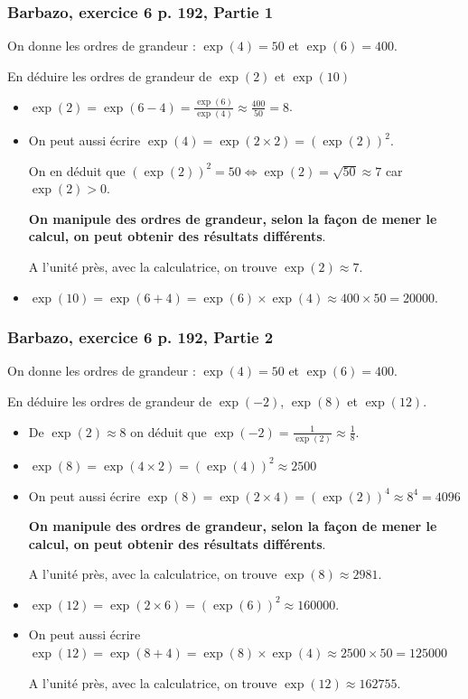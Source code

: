 \documentclass[11pt, hyperref={urlcolor=red,%
            linkcolor=blue, %
            colorlinks=true}]{beamer}
\begin{document}
\begin{frame}
\label{exo6}
\frametitle{Barbazo, exercice 6 p. 192, Partie 1}

On donne les ordres de grandeur : $\exp(4)=50$ et $\exp(6)=400$.

En déduire les ordres de grandeur de $\exp(2)$ et $\exp(10)$

\begin{itemize}
	\item $\exp(2) = \exp(6-4)=\frac{\exp(6)}{\exp(4)}\approx \frac{400}{50}=8$.
	\item On peut aussi écrire $\exp(4) = \exp(2 \times 2)=\left(\exp(2)\right)^{2}$.
	
	On en déduit que $\left(\exp(2)\right)^{2}=50 \Leftrightarrow \exp(2)=\sqrt{50} \approx 7$ car $\exp(2)>0$.
	
	
\textbf{On manipule des ordres de grandeur, selon la façon de mener le calcul, on peut obtenir des résultats différents}.

A l'unité près, avec la calculatrice, on trouve $\exp(2) \approx 7$.

	\item $\exp(10)=\exp(6 + 4)=\exp(6) \times \exp(4) \approx 400 \times 50 = 20000$.




	
\end{itemize}
\end{frame}


\begin{frame}
\frametitle{Barbazo, exercice 6 p. 192, Partie 2}

On donne les ordres de grandeur : $\exp(4)=50$ et $\exp(6)=400$.

En déduire les ordres de grandeur de  $\exp(-2)$, $\exp(8)$ et $\exp(12)$.

\begin{itemize}
	\item De $\exp(2) \approx 8$ on déduit que $\exp(-2)=\frac{1}{\exp(2)}\approx \frac{1}{8}$. 
	\item $\exp(8)= \exp(4 \times 2)=\left(\exp(4)\right)^{2}\approx 2500$
	
	
	\item On peut aussi écrire $\exp(8) = \exp(2 \times 4)=\left(\exp(2)\right)^{4}\approx 8^4 = 4096$
	
	\textbf{On manipule des ordres de grandeur, selon la façon de mener le calcul, on peut obtenir des résultats différents}.

A l'unité près, avec la calculatrice, on trouve $\exp(8) \approx 2981$.


	\item $\exp(12)=\exp(2 \times 6)=\left(\exp(6)\right)^{2}\approx 160000$.

	\item On peut aussi écrire $\exp(12) = \exp(8 + 4)=\exp(8) \times \exp(4) \approx 2500 \times 50 = 125000$


A l'unité près, avec la calculatrice, on trouve $\exp(12) \approx 162755$.
\end{itemize}
\end{frame}
\end{document}
